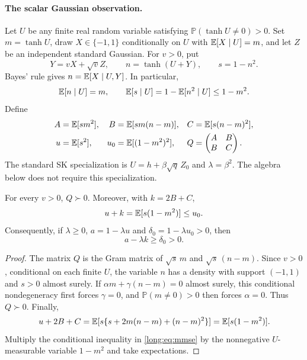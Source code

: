 \documentclass[11pt,reqno]{amsart}
\begin{document}
\paragraph{The scalar Gaussian observation.}
Let $U$ be any finite real random variable satisfying
$\mathbb P(\tanh U\ne0)>0$. Set $m=\tanh U$, draw
$X\in\{-1,1\}$ conditionally on $U$ with ${\mathbb{E}}[X\mid U]=m$, and let $Z$ be an
independent standard Gaussian. For $v>0$, put
\[
 Y=vX+\sqrt v Z,\qquad n=\tanh(U+Y),\qquad s=1-n^2.
\]
Bayes' rule gives $n={\mathbb{E}}[X\mid U,Y]$. In particular,
\begin{equation}\label{long:eq:mmse}
 {\mathbb{E}}[n\mid U]=m,
 \qquad {\mathbb{E}}[s\mid U]=1-{\mathbb{E}}[n^2\mid U]\le 1-m^2.
\end{equation}
Define
\begin{align*}
 A&={\mathbb{E}}[s m^2], & B&={\mathbb{E}}[s m(n-m)], & C&={\mathbb{E}}[s(n-m)^2],\\
 u&={\mathbb{E}}[s^2], & u_0&={\mathbb{E}}[(1-m^2)^2], &
 Q&=\begin{pmatrix}A&B\\B&C\end{pmatrix}.
\end{align*}
The standard SK specialization is $U=h+\beta\sqrt q\,Z_0$ and
$\lambda=\beta^2$. The algebra below does not require this specialization.

\begin{lem}\label{long:lem:scalar}
For every $v>0$, $Q\succ0$. Moreover, with $k=2B+C$,
\begin{equation*}
 u+k={\mathbb{E}}[s(1-m^2)]\le u_0.
\end{equation*}
Consequently, if $\lambda\ge0$, $a=1-\lambda u$ and
$\delta_0=1-\lambda u_0>0$, then
\[
 a-\lambda k\ge\delta_0>0.
\]
\end{lem}
\begin{proof}
The matrix $Q$ is the Gram matrix of $\sqrt s\,m$ and
$\sqrt s\,(n-m)$. Since $v>0$, conditional on each finite $U$, the variable
$n$ has a density with support $(-1,1)$ and $s>0$ almost surely. If
$\alpha m+\gamma(n-m)=0$ almost surely, this conditional nondegeneracy
first forces $\gamma=0$, and $\mathbb P(m\ne0)>0$ then forces $\alpha=0$.
Thus $Q\succ0$. Finally,
\[
 u+2B+C
 ={\mathbb{E}}[s\{s+2m(n-m)+(n-m)^2\}]
 ={\mathbb{E}}[s(1-m^2)].
\]
Multiply the conditional inequality in \eqref{long:eq:mmse} by the nonnegative
$U$-measurable variable $1-m^2$ and take expectations.
\end{proof}
\end{document}

